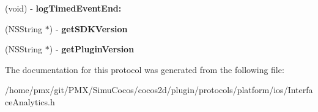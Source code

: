 \begin{DoxyCompactItemize}
\mbox{\label{protocolInterfaceAnalytics_01-p_a86ee58b4054b993f2a31f09886f06402}} 
(void) -\/ {\bfseries log\+Timed\+Event\+End\+:}
\item 
\mbox{\label{protocolInterfaceAnalytics_01-p_a7d9133854a8edc41a6162bb884bc76e2}} 
(N\+S\+String $\ast$) -\/ {\bfseries get\+S\+D\+K\+Version}
\item 
\mbox{\label{protocolInterfaceAnalytics_01-p_aebcf7326f2590d92c6f23996e08c5f35}} 
(N\+S\+String $\ast$) -\/ {\bfseries get\+Plugin\+Version}
\end{DoxyCompactItemize}


The documentation for this protocol was generated from the following file\+:\begin{DoxyCompactItemize}
\item 
/home/pmx/git/\+P\+M\+X/\+Simu\+Cocos/cocos2d/plugin/protocols/platform/ios/Interface\+Analytics.\+h\end{DoxyCompactItemize}
